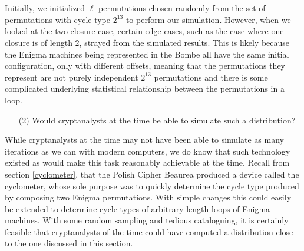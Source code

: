 \\\\Initially, we initialized $\ell$ permutations chosen randomly from the set of permutations with cycle type $2^{13}$ to perform our simulation. However, when we looked at the two closure case, certain edge cases, such as the case where one closure is of length $2$, strayed from the simulated results. This is likely because the Enigma machines being represented in the Bombe all have the same initial configuration, only with different offsets, meaning that the permutations they represent are not purely independent $2^{13}$ permutations and there is some complicated underlying statistical relationship between the permutations in a loop. 
\begin{enumerate}
	\item[(2)]Would cryptanalysts at the time be able to simulate such a distribution?
\end{enumerate}
While cryptanalysts at the time may not have been able to simulate as many iterations as we can with modern computers, we do know that such technology existed as would make this task reasonably achievable at the time. Recall from section \ref{cyclometer}, that the Polish Cipher Beaurea produced a device called the cyclometer, whose sole purpose was to quickly determine the cycle type produced by composing two Enigma permutations. With simple changes this could easily be extended to determine cycle types of arbitrary length loops of Enigma machines. With some random sampling and tedious cataloguing, it is certainly feasible that cryptanalysts of the time could have computed a distribution close to the one discussed in this section.
